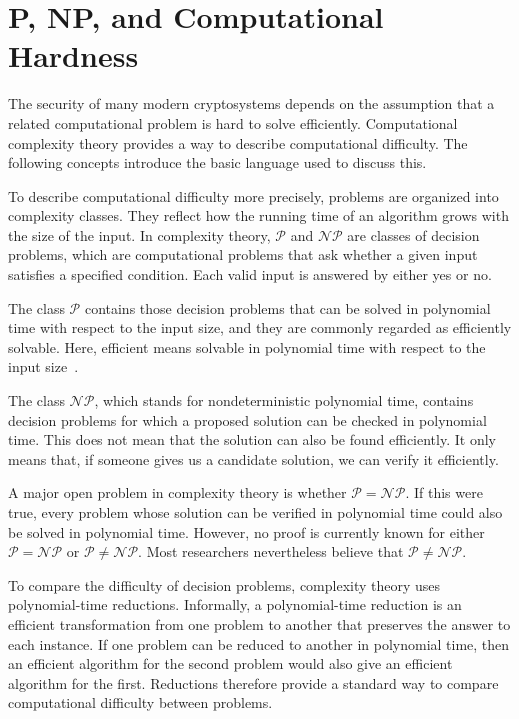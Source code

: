 \section{P, NP, and Computational Hardness}

The security of many modern cryptosystems depends on the assumption that a
related computational problem is hard to solve efficiently. Computational
complexity theory provides a way to describe computational difficulty. The
following concepts introduce the basic language used to discuss this.

To describe computational difficulty more precisely, problems are organized
into complexity classes. They reflect how the running time of an algorithm
grows with the size of the input. In complexity theory, $\mathcal{P}$ and
$\mathcal{NP}$ are classes of decision problems, which are computational
problems that ask whether a given input satisfies a specified condition. Each
valid input is answered by either yes or
no.~\cite[pp.~18--19]{garey1979computers} 

The class $\mathcal{P}$ contains those decision problems that can be solved in
polynomial time with respect to the input size, and they are commonly regarded
as efficiently solvable. Here, efficient means solvable in polynomial time with
respect to the input size~\cite[p.~27]{garey1979computers}.

The class $\mathcal{NP}$, which stands for nondeterministic polynomial time,
contains decision problems for which a proposed solution can be checked in
polynomial time. This does not mean that the solution can also be found
efficiently. It only means that, if someone gives us a candidate solution, we
can verify it efficiently.~\cite[pp.~28--29]{garey1979computers}

A major open problem in complexity theory is whether $\mathcal{P} =
\mathcal{NP}$. If this were true, every problem whose solution can be verified
in polynomial time could also be solved in polynomial time. However, no proof
is currently known for either $\mathcal{P} = \mathcal{NP}$ or $\mathcal{P} \neq
\mathcal{NP}$. Most researchers nevertheless believe that $\mathcal{P} \neq
\mathcal{NP}$.~\cite[ch.~9]{aumasson2017serious}

To compare the difficulty of decision problems, complexity theory uses
polynomial-time reductions. Informally, a polynomial-time reduction is an
efficient transformation from one problem to another that preserves the answer
to each instance. If one problem can be reduced to another in polynomial time,
then an efficient algorithm for the second problem would also give an efficient
algorithm for the first. Reductions therefore provide a standard way to compare
computational difficulty between problems.


